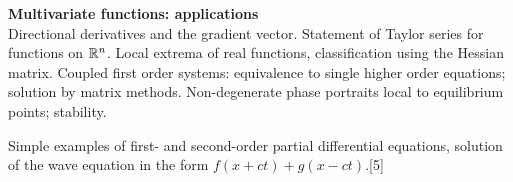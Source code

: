 \documentclass{article}
\begin{document}
{    \vspace{10pt}
    \noindent\textbf{Multivariate functions: applications}\\
    Directional derivatives and the gradient vector. Statement of Taylor series for functions on $\mathbb{R}^n$. Local extrema of real functions, classification using the Hessian matrix. Coupled first order systems: equivalence to single higher order equations; solution by matrix methods. Non-degenerate phase portraits local to equilibrium points; stability.
    
    \vspace{5pt}
    \noindent Simple examples of first- and second-order partial differential equations, solution of the wave equation in the form $f(x + ct) + g(x - ct)$.\hspace*{\fill}[5]}

\tableofcontents
\end{document}
